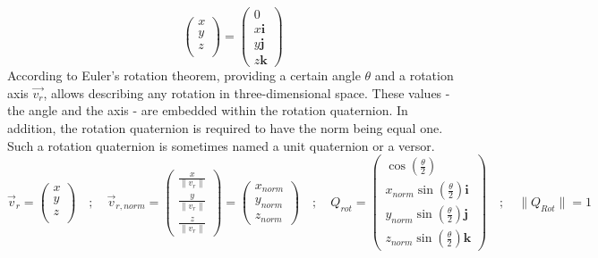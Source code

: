 \begin{equation*}
    \begin{pmatrix}
        x \\
        y \\
        z \\
    \end{pmatrix}
    =
    \begin{pmatrix}
        0           \\
        x\textbf{i} \\
        y\textbf{j} \\
        z\textbf{k}
    \end{pmatrix}
\end{equation*}
According to Euler's rotation theorem, providing a certain angle $\theta$ and a rotation axis $\vec{v_{r}}$, allows describing any rotation in three-dimensional space.
These values - the angle and the axis - are embedded within the rotation quaternion. In addition, the rotation quaternion is required to have the norm being equal one. Such a rotation quaternion is sometimes named a unit quaternion or a versor.
\begin{equation*}
    \vec{v}_{r} =
    \begin{pmatrix}
        x \\
        y \\
        z \\
    \end{pmatrix}
    \quad ; \quad
    \vec{v}_{r,norm} =
    \begin{pmatrix}
        \frac{x}{\lVert v_{r} \rVert} \\
        \frac{y}{\lVert v_{r} \rVert} \\
        \frac{z}{\lVert v_{r} \rVert}
    \end{pmatrix} =
    \begin{pmatrix}
        x_{norm} \\
        y_{norm} \\
        z_{norm}
    \end{pmatrix}
    \quad ; \quad
    Q_{rot}=
    \begin{pmatrix}
        \cos (\frac{\theta}{2} )                 \\
        x_{norm}\sin(\frac{\theta}{2})\textbf{i} \\
        y_{norm}\sin(\frac{\theta}{2})\textbf{j} \\
        z_{norm}\sin(\frac{\theta}{2})\textbf{k}
    \end{pmatrix}
    \quad ; \quad
    \lVert Q_{Rot} \rVert = 1
\end{equation*}

